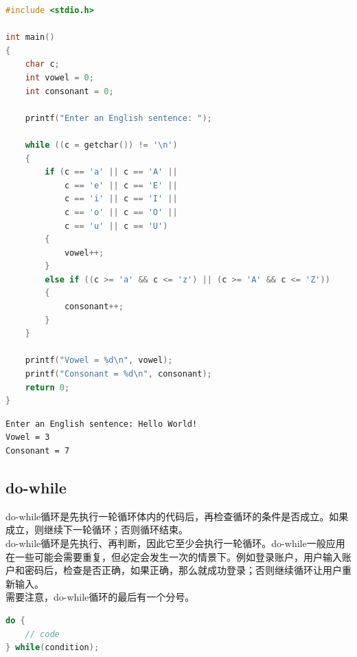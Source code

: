\vspace{0.5cm}


\begin{lstlisting}[language=C]
#include <stdio.h>

int main()
{
    char c;
    int vowel = 0;
    int consonant = 0;

    printf("Enter an English sentence: ");

    while ((c = getchar()) != '\n')
    {
        if (c == 'a' || c == 'A' ||
            c == 'e' || c == 'E' || 
            c == 'i' || c == 'I' || 
            c == 'o' || c == 'O' || 
            c == 'u' || c == 'U')
        {
            vowel++;
        }
        else if ((c >= 'a' && c <= 'z') || (c >= 'A' && c <= 'Z'))
        {
            consonant++;
        }
    }

    printf("Vowel = %d\n", vowel);
    printf("Consonant = %d\n", consonant);
    return 0;
}
\end{lstlisting}

\begin{tcolorbox}
    \begin{verbatim}
Enter an English sentence: Hello World!
Vowel = 3
Consonant = 7
\end{verbatim}
\end{tcolorbox}

\vspace{0.5cm}

\subsection{do-while}

do-while循环是先执行一轮循环体内的代码后，再检查循环的条件是否成立。如果成立，则继续下一轮循环；否则循环结束。\\

do-while循环是先执行、再判断，因此它至少会执行一轮循环。do-while一般应用在一些可能会需要重复，但必定会发生一次的情景下。例如登录账户，用户输入账户和密码后，检查是否正确，如果正确，那么就成功登录；否则继续循环让用户重新输入。\\

需要注意，do-while循环的最后有一个分号。

\vspace{-0.5cm}

\begin{lstlisting}[language=C]
do {
    // code
} while(condition);
\end{lstlisting}

